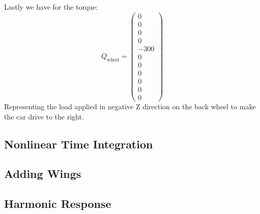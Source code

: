 Lastly we have for the torque:
\begin{equation}
    Q_\text{wheel} = 
    \begin{pmatrix}
        0\\
        0\\
        0\\
        0\\
        -300\\
        0\\
        0\\
        0\\
        0\\
        0\\
        0
    \end{pmatrix}
\end{equation}
Representing the load applied in negative Z direction on the back wheel to make the car drive to the right.

\subsection{Nonlinear Time Integration}
\subsubsection{}
\subsubsection{}
\subsubsection{}
\subsubsection{}
\subsection{Adding Wings}
\subsubsection{}
\subsubsection{}
\subsubsection{}
\subsubsection{}
\subsection{Harmonic Response}


